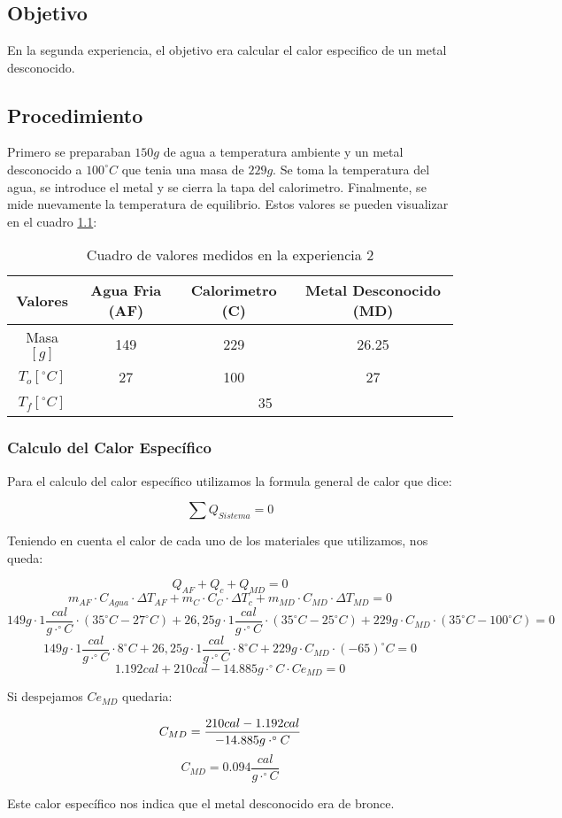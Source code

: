 \documentclass[12pt]{report}
\begin{document}
\chapter{}
\section{Objetivo}
En la segunda experiencia, el objetivo era calcular el calor especifico de un metal desconocido.

\section{Procedimiento}
Primero se preparaban $150 g$ de agua a temperatura ambiente y un metal desconocido a $100^\circ C$ que tenia una masa de $229 g$. Se toma la temperatura del agua, se introduce el metal y se cierra la tapa del calorimetro. Finalmente, se mide nuevamente la temperatura de equilibrio.
Estos valores se pueden visualizar en el cuadro \ref{table:data}:

\begin{table}[h!]
\centering
\begin{tabular}{|c|c|c|c|}
    \hline
    Valores & Agua Fria (AF) & Calorimetro (C) & Metal Desconocido (MD) \\
    \hline
    Masa$[g]$ & 149 & 229 & 26.25 \\
    \hline
    $T_o [^\circ C]$ & 27 & 100 & 27 \\
    \hline
    $T_f [^\circ C]$ & \multicolumn{3}{|c|}{35}\\
    \hline
\end{tabular}
\caption{Cuadro de valores medidos en la experiencia 2}
\label{table:data}
\end{table}

\subsection{Calculo del Calor Específico}

Para el calculo del calor específico utilizamos la formula general de calor que dice:

$$\sum Q_{Sistema} = 0$$

\noindent
Teniendo en cuenta el calor de cada uno de los materiales que utilizamos, nos queda:

$$Q_{AF} + Q_c + Q_{MD} = 0$$
$$m_{AF} \cdot C_{Agua} \cdot {\Delta T}_{AF} + m_C \cdot C_C \cdot {\Delta T}_c + m_{MD} \cdot C_{MD} \cdot {\Delta T}_{MD} = 0$$
$$149g \cdot 1 \frac{cal}{g\cdot^\circ C} \cdot (35^\circ C - 27^\circ C) + 26,25g \cdot 1 \frac{cal}{g\cdot^\circ C} \cdot (35^\circ C - 25^\circ C) + 229g \cdot  C_{MD} \cdot (35^\circ C - 100^\circ C) = 0$$
$$149g \cdot 1 \frac{cal}{g\cdot^\circ C} \cdot 8^\circ C + 26,25g \cdot 1 \frac{cal}{g\cdot^\circ C} \cdot 8^\circ C + 229g \cdot C_{MD}  \cdot (-65)^\circ C = 0$$
$$1.192 cal + 210 cal - 14.885 g\cdot^\circ C \cdot Ce_{MD}  = 0$$

\noindent
Si despejamos $Ce_{MD}$ quedaria:

$$C_{MD}  = \frac{210 cal - 1.192 cal}{-14.885 g\cdot^\circ C}\\$$
$$C_{MD}  = 0.094 \frac{cal}{g\cdot^\circ C}$$

\noindent
Este calor específico nos indica que el metal desconocido era de bronce.
\end{document}

